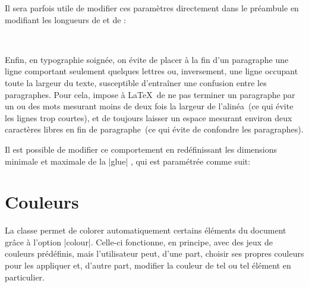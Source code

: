 Il sera parfois utile de modifier ces paramètres directement dans le préambule en modifiant les longueurs de  et de :

\begin{macro}
\setlength{\parskip}{0pt}%
\setlength{\parindent}{1.5em}%
 
\setlength{\parskip}{\baselineskip}%
\setlength{\parindent}{0em}%
\end{macro}

Enfin, en typographie soignée, on évite de placer à la fin d'un paragraphe une ligne comportant seulement quelques lettres ou, inversement, une ligne occupant toute la largeur du texte, susceptible d'entraîner une confusion entre les paragraphes. Pour cela, \frenchlaw impose à \LaTeX\ de ne pas terminer un paragraphe par un ou des mots mesurant moins de deux fois la largeur de l'alinéa~(ce qui évite les lignes trop courtes), et de toujours laisser un espace mesurant environ deux caractères libres en fin de paragraphe~(ce qui évite de confondre les paragraphes).

\begin{noprint}
\setlength{\parfillskip}{2ex plus \dimexpr\linewidth-3em}
\end{noprint}

\begin{developer}
Il est possible de modifier ce comportement en redéfinissant les dimensions minimale et maximale de la |glue| , qui est paramétrée comme suit:\par
\vspace{-\baselineskip}
\begin{macro}
\setlength{\parfillskip}{2ex plus \dimexpr\linewidth -3em}
\end{macro}
\end{developer}



\section{Couleurs}\label{Couleurs}

La classe \frenchlaw permet de colorer automatiquement certains éléments du document grâce à l'option |colour|. Celle-ci fonctionne, en principe, avec des jeux de couleurs prédéfinis, mais l'utilisateur peut, d'une part, choisir ses propres couleurs pour les appliquer et, d'autre part, modifier la couleur de tel ou tel élément en particulier.

